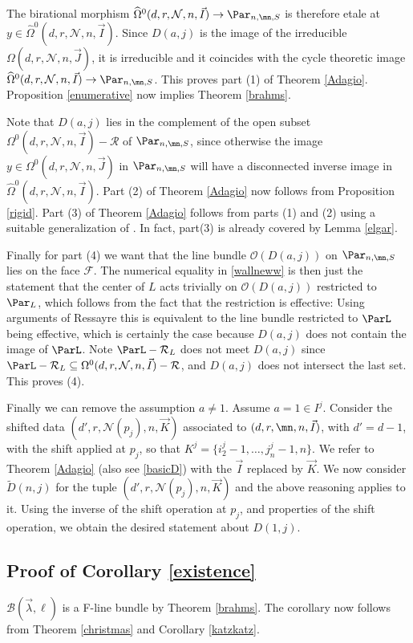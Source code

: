 The birational morphism $\widehat{\Omega}^0(d,r,\mathcal{N},n,\vec{I})\to  {\Par}_{n,\mn,S}$ is therefore  etale at $y\in \widehat{\Omega}^0(d,r,\mathcal{N},n,\vec{I})$. Since $D(a,j)$ is the  image of the irreducible  $\Omega(d,r,\mathcal{N},n,\vec{J})$, it is irreducible and it coincides with the cycle theoretic image $\widehat{\Omega}^0(d,r,\mathcal{N},n,\vec{I})\to  {\Par}_{n,\mn,S}$. This proves part (1) of Theorem \ref{Adagio}. Proposition \ref{enumerative} now implies Theorem \ref{brahms}.

 Note that $D(a,j)$ lies in the complement of the open subset $\Omega^0(d,r,\mathcal{N},n,\vec{I})-\mathcal{R}$ of ${\Par}_{n,\mn,S}$, since otherwise the image $y\in \Omega^0(d,r,\mathcal{N},n,\vec{J})$ in ${\Par}_{n,\mn,S}$ will have a disconnected inverse image in $\widehat{\Omega}^0(d,r,\mathcal{N},n,\vec{I})$. Part (2) of Theorem \ref{Adagio} now follows from Proposition \ref{rigid}. Part (3) of Theorem \ref{Adagio} follows from parts (1) and (2) using a suitable generalization of \cite[Lemma 2.1]{BHermit}. In fact, part(3) is already covered by Lemma \ref{elgar}.

Finally for part (4) we want that the line bundle $\mathcal{O}(D(a,j))$ on ${\Par}_{n,\mn,S}$ lies on the face $\mathcal{F}$. The numerical equality in \eqref{wallneww} is then just the statement that the center of $L$ acts trivially on $\mathcal{O}(D(a,j))$ restricted to $\Par_L$, which follows from the fact that the restriction is effective: Using arguments of Ressayre \cite{R1} this is equivalent to the line bundle restricted to $\ParL$ being effective, which is certainly the case because $D(a,j)$ does not contain the image of $\ParL$. Note  $\ParL-\mathcal{R}_L$ does not meet $D(a,j)$ since $\ParL-\mathcal{R}_L\subseteq \Omega^0(d,r,\mathcal{N},n,\vec{I})-\mathcal{R}$, and $D(a,j)$ does not intersect the last set.  This proves (4).

Finally we can remove the assumption $a\neq 1$. Assume $a=1\in I^j$. Consider the shifted data
$(d',r,\mathcal{N}(p_j),n,\vec{K})$ associated to $(d,r,\mn,n,\vec{I})$, with $d'=d-1$, with the shift applied at $p_j$, so that $K^j=\{i^j_2-1,\dots, j^j_n -1,n\}$. We refer to Theorem \ref{Adagio} (also see \eqref{basicD}) with the $\vec{I}$ replaced by $\vec{K}$. We now consider $\tilde{D}(n,j)$ for the tuple $(d',r,\mathcal{N}(p_j),n,\vec{K})$ and the above reasoning applies to it.  Using the inverse of the shift operation at $p_j$, and properties of the shift operation, we obtain the desired statement about $D(1,j)$.\subsection{Proof of Corollary \ref{existence}}
$\mathcal{B}(\vec{\lambda},\ell)$ is a F-line bundle by Theorem \ref{brahms}. The corollary now follows from Theorem \ref{christmas} and Corollary \ref{katzkatz}.
\iffalse

